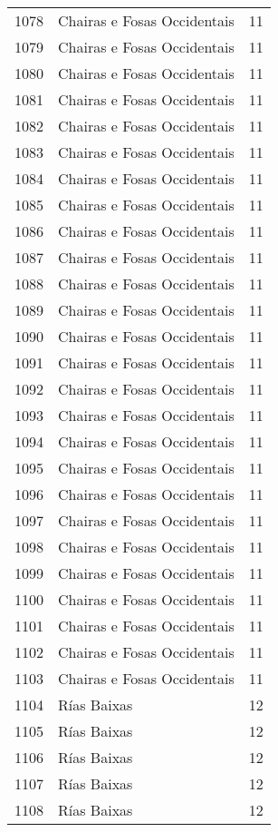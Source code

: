 \begin{table}[p]
\begin{tabular}{rlr}
  1078 & Chairas e Fosas Occidentais &  11 \\ 
  1079 & Chairas e Fosas Occidentais &  11 \\ 
  1080 & Chairas e Fosas Occidentais &  11 \\ 
  1081 & Chairas e Fosas Occidentais &  11 \\ 
  1082 & Chairas e Fosas Occidentais &  11 \\ 
  1083 & Chairas e Fosas Occidentais &  11 \\ 
  1084 & Chairas e Fosas Occidentais &  11 \\ 
  1085 & Chairas e Fosas Occidentais &  11 \\ 
  1086 & Chairas e Fosas Occidentais &  11 \\ 
  1087 & Chairas e Fosas Occidentais &  11 \\ 
  1088 & Chairas e Fosas Occidentais &  11 \\ 
  1089 & Chairas e Fosas Occidentais &  11 \\ 
  1090 & Chairas e Fosas Occidentais &  11 \\ 
  1091 & Chairas e Fosas Occidentais &  11 \\ 
  1092 & Chairas e Fosas Occidentais &  11 \\ 
  1093 & Chairas e Fosas Occidentais &  11 \\ 
  1094 & Chairas e Fosas Occidentais &  11 \\ 
  1095 & Chairas e Fosas Occidentais &  11 \\ 
  1096 & Chairas e Fosas Occidentais &  11 \\ 
  1097 & Chairas e Fosas Occidentais &  11 \\ 
  1098 & Chairas e Fosas Occidentais &  11 \\ 
  1099 & Chairas e Fosas Occidentais &  11 \\ 
  1100 & Chairas e Fosas Occidentais &  11 \\ 
  1101 & Chairas e Fosas Occidentais &  11 \\ 
  1102 & Chairas e Fosas Occidentais &  11 \\ 
  1103 & Chairas e Fosas Occidentais &  11 \\ 
  1104 & Rías Baixas &  12 \\ 
  1105 & Rías Baixas &  12 \\ 
  1106 & Rías Baixas &  12 \\ 
  1107 & Rías Baixas &  12 \\ 
  1108 & Rías Baixas &  12 \\ 

\end{tabular}
\end{table}
